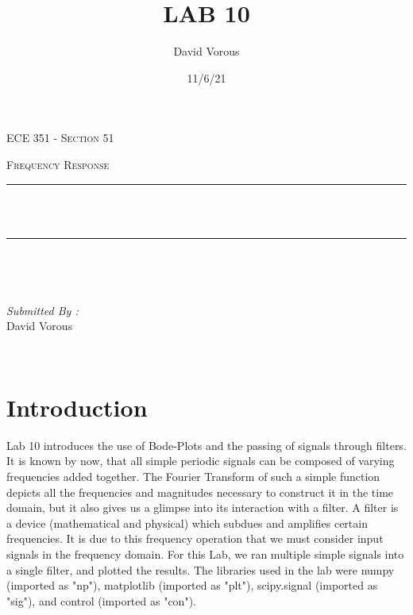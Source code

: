 \documentclass[12pt]{report}
\title{LAB 10}
\author{ David Vorous}
\date{11/6/21}
\makeatletter
\let\thetitle\@title
\makeatother
\begin{document}
\begin{titlepage}
	\centering
    \vspace*{0.5 cm}
\begin{center}    \textsc{\Large   ECE 351 - Section 51 }\\[2.0 cm]	\end{center}
	\textsc{\Large Frequency Response }\\[0.5 cm]
	\rule{\linewidth}{0.2 mm} \\[0.4 cm]
	{ \huge \bfseries \thetitle}\\
	\rule{\linewidth}{0.2 mm} \\[1.5 cm]
	
	\begin{minipage}{0.4\textwidth}
		\begin{flushleft} \large
			\end{flushleft}
			\end{minipage}~
			\begin{minipage}{0.4\textwidth}
            
			\begin{flushright} \large
			\emph{Submitted By :} \\
			David Vorous  
		\end{flushright}
           
	\end{minipage}\\[2 cm]

\end{titlepage}


\tableofcontents

\pagebreak

\renewcommand{\thesection}{\arabic{section}}

\section{Introduction}
Lab 10 introduces the use of Bode-Plots and the passing of signals through filters. It is known by now, that all simple periodic signals can be composed of varying frequencies added together. The Fourier Transform of such a simple function depicts all the frequencies and magnitudes necessary to construct it in the time domain, but it also gives us a glimpse into its interaction with a filter. A filter is a device (mathematical and physical) which subdues and amplifies certain frequencies. It is due to this frequency operation that we must consider input signals in the frequency domain. For this Lab, we ran multiple simple signals into a single filter, and plotted the results. The libraries used in the lab were numpy (imported as "np"), matplotlib (imported as "plt"), scipy.signal (imported as "sig"), and control (imported as "con").
\end{document}
